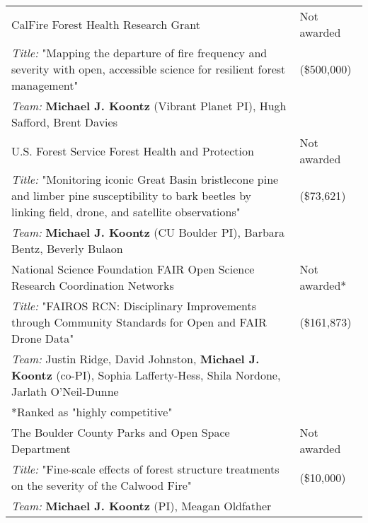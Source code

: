 \begin{longtable}{@{}>{\raggedright}p{5.25in} @{} >{\raggedleft}X@{}}

CalFire Forest Health Research Grant & Not awarded \tabularnewline
\addtolength{\leftskip}{5ex}\emph{Title:} "Mapping the departure of fire frequency and severity with open, accessible science for
resilient forest management" & (\$500,000) \tabularnewline
\addtolength{\leftskip}{5ex}\emph{Team:} \textbf{Michael J. Koontz} (Vibrant Planet PI), Hugh Safford, Brent Davies & \tabularnewline

U.S. Forest Service Forest Health and Protection & Not awarded \tabularnewline
\addtolength{\leftskip}{5ex}\emph{Title:} "Monitoring iconic Great Basin bristlecone pine and limber pine susceptibility to bark beetles by linking field, drone, and satellite observations" & (\$73,621) \tabularnewline
\addtolength{\leftskip}{5ex}\emph{Team:} \textbf{Michael J. Koontz} (CU Boulder PI), Barbara Bentz, Beverly Bulaon & \tabularnewline

National Science Foundation FAIR Open Science Research Coordination Networks & Not awarded* \tabularnewline
\addtolength{\leftskip}{5ex}\emph{Title:} "FAIROS RCN: Disciplinary Improvements through Community Standards for Open and FAIR Drone Data" & (\$161,873) \tabularnewline
\addtolength{\leftskip}{5ex}\emph{Team:} Justin Ridge, David Johnston, \textbf{Michael J. Koontz} (co-PI), Sophia Lafferty-Hess, Shila Nordone, Jarlath O'Neil-Dunne \tabularnewline
\addtolength{\leftskip}{5ex} *Ranked as "highly competitive" & \tabularnewline

The Boulder County Parks and Open Space Department & Not awarded \tabularnewline
\addtolength{\leftskip}{5ex}\emph{Title:} "Fine-scale effects of forest structure treatments on the severity of the Calwood Fire" & (\$10,000) \tabularnewline
\addtolength{\leftskip}{5ex}\emph{Team:} \textbf{Michael J. Koontz} (PI), Meagan Oldfather & \tabularnewline

\end{longtable}
